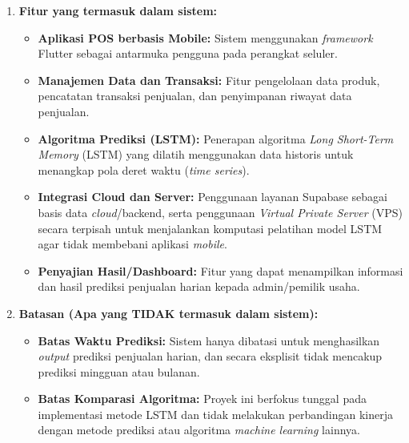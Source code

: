 \documentclass[12pt, a4paper]{article}
\begin{document}
\begin{enumerate}[label=\arabic*)]
    \item \textbf{Fitur yang termasuk dalam sistem:}
    \begin{itemize}
        \item \textbf{Aplikasi POS berbasis Mobile:} Sistem menggunakan \textit{framework} Flutter sebagai antarmuka pengguna pada perangkat seluler.
        \item \textbf{Manajemen Data dan Transaksi:} Fitur pengelolaan data produk, pencatatan transaksi penjualan, dan penyimpanan riwayat data penjualan.
        \item \textbf{Algoritma Prediksi (LSTM):} Penerapan algoritma \textit{Long Short-Term Memory} (LSTM) yang dilatih menggunakan data historis untuk menangkap pola deret waktu (\textit{time series}).
        \item \textbf{Integrasi Cloud dan Server:} Penggunaan layanan Supabase sebagai basis data \textit{cloud}/backend, serta penggunaan \textit{Virtual Private Server} (VPS) secara terpisah untuk menjalankan komputasi pelatihan model LSTM agar tidak membebani aplikasi \textit{mobile}.
        \item \textbf{Penyajian Hasil/Dashboard:} Fitur yang dapat menampilkan informasi dan hasil prediksi penjualan harian kepada admin/pemilik usaha.
    \end{itemize}
    
    \item \textbf{Batasan (Apa yang TIDAK termasuk dalam sistem):}
    \begin{itemize}
        \item \textbf{Batas Waktu Prediksi:} Sistem hanya dibatasi untuk menghasilkan \textit{output} prediksi penjualan harian, dan secara eksplisit tidak mencakup prediksi mingguan atau bulanan.
        \item \textbf{Batas Komparasi Algoritma:} Proyek ini berfokus tunggal pada implementasi metode LSTM dan tidak melakukan perbandingan kinerja dengan metode prediksi atau algoritma \textit{machine learning} lainnya.
    \end{itemize}
\end{enumerate}
\end{document}

